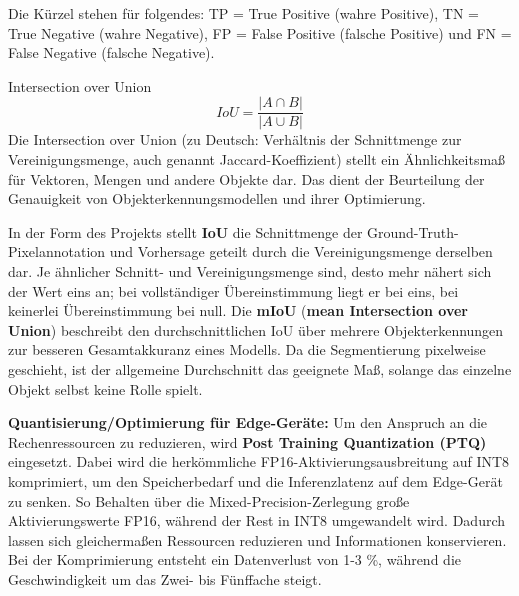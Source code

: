 Die Kürzel stehen für folgendes: TP = True Positive (wahre Positive), TN = True Negative (wahre Negative), FP = False Positive (falsche Positive) und FN = False Negative (falsche Negative).

Intersection over Union
\begin{equation}
    IoU = \frac{|A\cap B|}{|A\cup B|}
\end{equation}
Die Intersection over Union (zu Deutsch: Verhältnis der Schnittmenge zur Vereinigungsmenge, auch genannt Jaccard-Koeffizient) stellt ein Ähnlichkeitsmaß für Vektoren, Mengen und andere Objekte dar. Das dient der Beurteilung der Genauigkeit von Objekterkennungsmodellen und ihrer Optimierung. \cite{goodfellow_2016}

In der Form des Projekts stellt \textbf{IoU} die Schnittmenge der Ground-Truth-Pixelannotation und Vorhersage geteilt durch die Vereinigungsmenge derselben dar. Je ähnlicher Schnitt- und Vereinigungsmenge sind, desto mehr nähert sich der Wert eins an; bei vollständiger Übereinstimmung liegt er bei eins, bei keinerlei Übereinstimmung bei null. Die \textbf{mIoU} (\textbf{mean Intersection over Union}) beschreibt den durchschnittlichen IoU über mehrere Objekterkennungen zur besseren Gesamtakkuranz eines Modells. Da die Segmentierung pixelweise geschieht, ist der allgemeine Durchschnitt das geeignete Maß, solange das einzelne Objekt selbst keine Rolle spielt.

\textbf{Quantisierung/Optimierung für Edge-Geräte:} Um den Anspruch an die Rechenressourcen zu reduzieren, wird \textbf{Post Training Quantization (PTQ)} eingesetzt. Dabei wird die herkömmliche FP16-Aktivierungsausbreitung auf INT8 komprimiert, um den Speicherbedarf und die Inferenzlatenz auf dem Edge-Gerät zu senken. So Behalten über die Mixed-Precision-Zerlegung große Aktivierungswerte FP16, während der Rest in INT8 umgewandelt wird. Dadurch lassen sich gleichermaßen Ressourcen reduzieren und Informationen konservieren. Bei der Komprimierung entsteht ein Datenverlust von 1-3 \%, während die Geschwindigkeit um das Zwei- bis Fünffache steigt. \cite{TensorFlow_2022}

